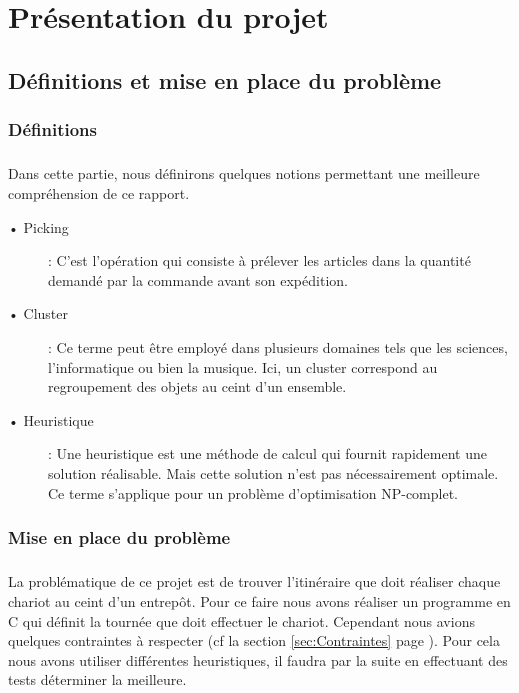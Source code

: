 \documentclass[twoside,UTF8]{EPURapport}
\begin{document}

\chapter{Présentation du projet}

\section{Définitions et mise en place du problème}
\subsection{Définitions}
\paragraph{}Dans cette partie, nous définirons quelques notions permettant une meilleure compréhension de ce rapport.
\begin{description}
\item[• Picking]: C'est l'opération qui consiste à prélever les articles dans la quantité demandé par la commande avant son expédition.

\item[• Cluster]: Ce terme peut être employé dans plusieurs domaines tels que les sciences, l'informatique ou bien la musique. Ici, un cluster correspond au regroupement des objets au ceint d'un ensemble.
\item[• Heuristique] : Une heuristique est une méthode de calcul qui fournit rapidement une solution réalisable. Mais cette solution n'est pas nécessairement optimale. Ce terme s'applique pour un problème d'optimisation NP-complet.
\end{description}


\subsection{Mise en place du problème }
\paragraph{}La problématique de ce projet est de trouver l'itinéraire que doit réaliser chaque chariot au ceint d'un entrepôt. Pour ce faire nous avons réaliser un programme en C qui définit la tournée que doit effectuer le chariot. Cependant nous avions quelques contraintes à respecter (cf la section \ref{sec:Contraintes} page \pageref{sec:Contraintes}). Pour cela nous avons utiliser différentes heuristiques, il faudra par la suite en effectuant des tests déterminer la meilleure.
\end{document}
